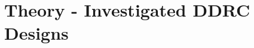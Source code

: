 \documentclass[../main2.tex]{subfiles}
\providecommand{\rootdir}{..}
\begin{document}
\FloatBarrier
\section{Theory - Investigated DDRC Designs} \label{theory_DDRC}












\end{document}

